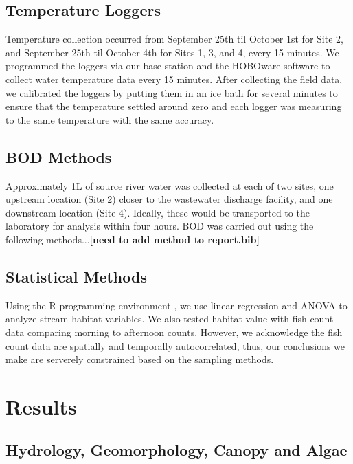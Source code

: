 \documentclass{article}\usepackage[]{graphicx}\usepackage[]{color}
\begin{document}
\subsection{Temperature Loggers}

Temperature collection occurred from September 25th til October 1st for Site 2, and September 25th til October 4th for Sites 1, 3, and 4, every 15 minutes. We programmed the loggers via our base station and the HOBOware software to collect water temperature data every 15 minutes. After collecting the field data, we calibrated the loggers by putting them in an ice bath for several minutes to ensure that the temperature settled around zero and each logger was measuring to the same temperature with the same accuracy.

\subsection{BOD Methods}

Approximately 1L of source river water was collected at each of two sites, one upstream location (Site 2) closer to the wastewater discharge facility, and one downstream location (Site 4). Ideally, these would be transported to the laboratory for analysis within four hours. BOD was carried out using the following methods...\textbf{[need to add method to report.bib]}

\subsection{Statistical Methods}

Using the R programming environment \citep{CRAN}, we use linear regression and ANOVA to analyze stream habitat variables. We also tested habitat value with fish count data comparing morning to afternoon counts. However, we acknowledge the fish count data are spatially and temporally autocorrelated, thus, our conclusions we make are serverely constrained based on the sampling methods.

\section{Results}



\subsection{Hydrology, Geomorphology, Canopy and Algae}
\end{document}
